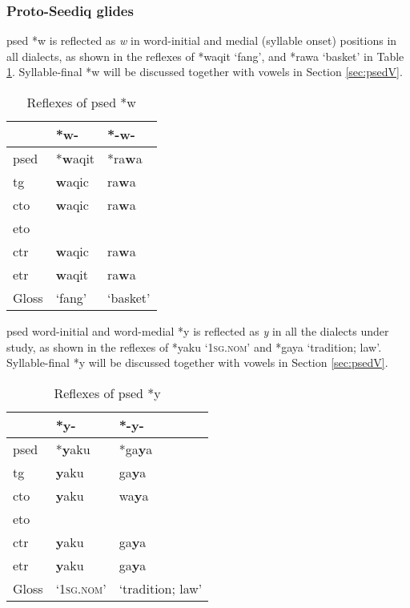 \subsubsection{Proto-Seediq glides}

\acl{psed} *w is reflected as \textit{w} in word-initial and medial (syllable onset) positions in all dialects, as shown in the reflexes of *waqit `fang', and *rawa `basket' in Table \ref{tab:psed_w}. Syllable-final *w will be discussed together with vowels in Section \ref{sec:psedV}.

\begin{table}[!htbp]
\centering
\caption{Reflexes of \acl{psed} *w}
\label{tab:psed_w}
\begin{tabular}{lll}
\hline
           & *w-    & *-w-     \\ \hline
\acs{psed} & *\textbf{w}aqit & *ra\textbf{w}a    \\ \hdashline
\acs{tg}   & \textbf{w}aqic  & ra\textbf{w}a     \\
\acs{cto}  & \textbf{w}aqic  & ra\textbf{w}a     \\
\acs{eto}  &        &          \\
\acs{ctr}  & \textbf{w}aqic  & ra\textbf{w}a     \\
\acs{etr}  & \textbf{w}aqit  & ra\textbf{w}a     \\ \hline
Gloss      & `fang' & `basket' \\ \hline
\end{tabular}
\end{table}

\acl{psed} word-initial and word-medial *y is reflected as \textit{y} in all the dialects under study, as shown in the reflexes of *yaku `\textsc{1sg.nom}' and *gaya `tradition; law'. Syllable-final *y will be discussed together with vowels in Section \ref{sec:psedV}.

\begin{table}[!htbp]
\centering
\caption{Reflexes of \acl{psed} *y}
\label{tab:psed_y}
\begin{tabular}{lll}
\hline
           & *y-                & *-y-             \\ \hline
\acs{psed} & *\textbf{y}aku              & *ga\textbf{y}a            \\ \hdashline
\acs{tg}   & \textbf{y}aku               & ga\textbf{y}a             \\
\acs{cto}  & \textbf{y}aku               & wa\textbf{y}a             \\
\acs{eto}  &                    &                  \\
\acs{ctr}  & \textbf{y}aku               & ga\textbf{y}a             \\
\acs{etr}  & \textbf{y}aku               & ga\textbf{y}a             \\ \hline
Gloss      & `\textsc{1sg.nom}' & `tradition; law' \\ \hline
\end{tabular}
\end{table}


